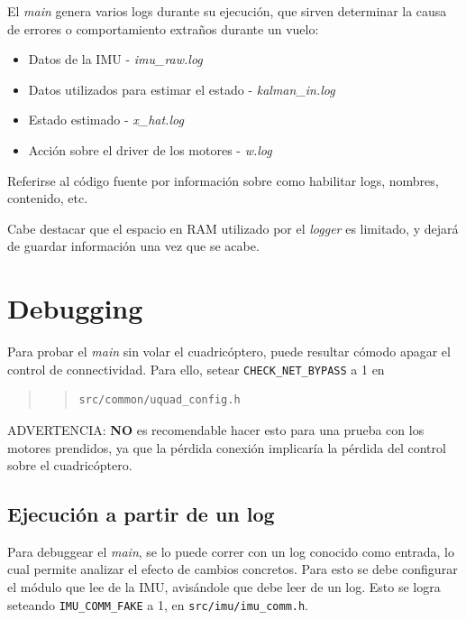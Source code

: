 \documentclass[main]{subfiles}
\begin{document}
El \textit{main} genera varios logs durante su ejecución, que sirven determinar la causa de errores o comportamiento extraños durante un vuelo:
\begin{itemize}
\item Datos de la IMU - \textit{imu\_raw.log}
\item Datos utilizados para estimar el estado - \textit{kalman\_in.log}
\item Estado estimado - \textit{x\_hat.log}
\item Acción sobre el driver de los motores - \textit{w.log}
\end{itemize}

Referirse al código fuente por información sobre como habilitar logs, nombres, contenido, etc.

Cabe destacar que el espacio en RAM utilizado por el \textit{logger} es limitado, y dejará de guardar información una vez que se acabe.

\section{Debugging}
\label{sec:codigo:debugging}

Para probar el \textit{main} sin volar el cuadricóptero, puede resultar cómodo apagar el control de connectividad. Para ello, setear \verb+CHECK_NET_BYPASS+ a 1 en
\begin{quote}
\begin{quote}
\begin{verbatim}
src/common/uquad_config.h
\end{verbatim}
\end{quote}
\end{quote}

ADVERTENCIA: \textbf{NO} es recomendable hacer esto para una prueba con los motores prendidos, ya que la pérdida conexión implicaría la pérdida del control sobre el cuadricóptero.

\subsection{Ejecución a partir de un log}
\label{sec:codigo:ejecucion-a-partir-de-un-log}

Para debuggear el \textit{main}, se lo puede correr con un log conocido como entrada, lo cual permite analizar el efecto de cambios concretos. Para esto se debe configurar el módulo que lee de la IMU, avisándole que debe leer de un log. Esto se logra seteando \verb+IMU_COMM_FAKE+ a 1, en \verb+src/imu/imu_comm.h+.
\end{document}
